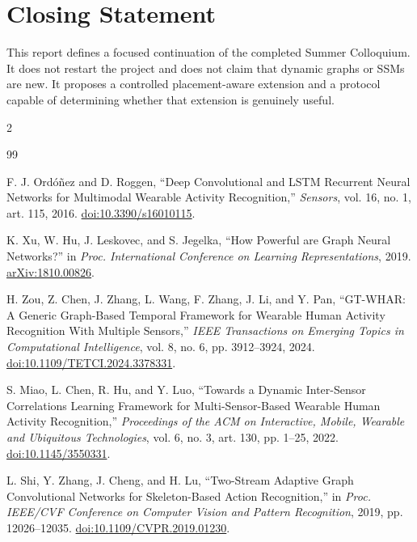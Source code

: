 \documentclass[12pt,a4paper,twoside,openright]{report}
\begin{document}
\section{Closing Statement}
This report defines a focused continuation of the completed Summer Colloquium. It does not restart the project and does not claim that dynamic graphs or SSMs are new. It proposes a controlled placement-aware extension and a protocol capable of determining whether that extension is genuinely useful.

\cleardoublepage
\begin{multicols}{2}
\small
\begin{thebibliography}{99}
\raggedright
\setlength{\itemsep}{3pt}
\setlength{\parskip}{0pt}

F. J. Ord\'o\~nez and D. Roggen,
``Deep Convolutional and LSTM Recurrent Neural Networks for Multimodal Wearable Activity Recognition,''
\emph{Sensors}, vol. 16, no. 1, art. 115, 2016.
\href{https://doi.org/10.3390/s16010115}{doi:10.3390/s16010115}.

K. Xu, W. Hu, J. Leskovec, and S. Jegelka,
``How Powerful are Graph Neural Networks?''
in \emph{Proc. International Conference on Learning Representations}, 2019.
\href{https://arxiv.org/abs/1810.00826}{arXiv:1810.00826}.

H. Zou, Z. Chen, J. Zhang, L. Wang, F. Zhang, J. Li, and Y. Pan,
``GT-WHAR: A Generic Graph-Based Temporal Framework for Wearable Human Activity Recognition With Multiple Sensors,''
\emph{IEEE Transactions on Emerging Topics in Computational Intelligence}, vol. 8, no. 6, pp. 3912--3924, 2024.
\href{https://doi.org/10.1109/TETCI.2024.3378331}{doi:10.1109/TETCI.2024.3378331}.

S. Miao, L. Chen, R. Hu, and Y. Luo,
``Towards a Dynamic Inter-Sensor Correlations Learning Framework for Multi-Sensor-Based Wearable Human Activity Recognition,''
\emph{Proceedings of the ACM on Interactive, Mobile, Wearable and Ubiquitous Technologies}, vol. 6, no. 3, art. 130, pp. 1--25, 2022.
\href{https://doi.org/10.1145/3550331}{doi:10.1145/3550331}.

L. Shi, Y. Zhang, J. Cheng, and H. Lu,
``Two-Stream Adaptive Graph Convolutional Networks for Skeleton-Based Action Recognition,''
in \emph{Proc. IEEE/CVF Conference on Computer Vision and Pattern Recognition}, 2019, pp. 12026--12035.
\href{https://doi.org/10.1109/CVPR.2019.01230}{doi:10.1109/CVPR.2019.01230}.


\end{thebibliography}
\end{multicols}
\end{document}
